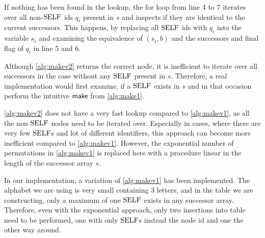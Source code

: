 If nothing has been found in the lookup, the for loop from line 4 to 7 iterates over all non-$\mathrm{SELF}$ ids $q_{i}$ present in $s$ and inspects if they are identical to the current successors. This happens, by replacing all $\mathrm{SELF}$ ids with $q_{i}$ into the variable $s_{i}$ and examining the equivalence of $(s_{i},b)$ and the successors and final flag of $q_{i}$ in line 5 and 6.
\par
Although \autoref{alg:makev2} returns the correct node, it is inefficient to iterate over all successors in the case without any $\mathrm{SELF}$ present in $s$. Therefore, a real implementation would first examine, if a $\mathrm{SELF}$ exists in $s$ and in that occasion perform the intuitive $\operatorname{\textsf{make}}$ from \autoref{alg:make1}.
\par 
\autoref{alg:makev2} does not have a very fast lookup compared to \autoref{alg:makev1}, as all the non $\mathrm{SELF}$ nodes need to be iterated over. Especially in cases, where there are very few $\mathrm{SELF}$s and lot of different identifiers, this approach can become more inefficient compared to \autoref{alg:makev1}. However, the exponential number of permutations in \autoref{alg:makev1} is replaced here with a procedure linear in the length of the successor array $s$.
\par 
In our implementation, a variation of \autoref{alg:makev1} has been implemented. The alphabet we are using is very small containing 3 letters, and in the table we are constructing, only a maximum of one $\mathrm{SELF}$ exists in any successor array. Therefore, even with the exponential approach, only two insertions into table need to be performed, one with only $\mathrm{SELF}$s instead the node id and one the other way around.

